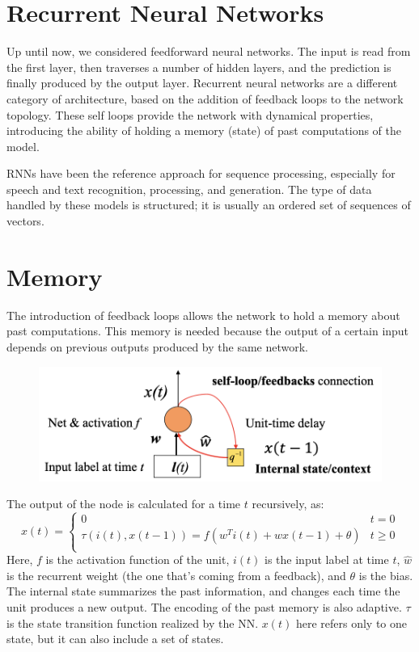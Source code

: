 \section{Recurrent Neural Networks}

Up until now, we considered feedforward neural networks. The input is read from the first layer, then traverses a number of hidden layers, and the prediction is finally produced by the output layer. Recurrent neural networks are a different category of architecture, based on the addition of feedback loops to the network topology. These self loops provide the network with dynamical properties, introducing the ability of holding a memory (state) of past computations of the model.

RNNs have been the reference approach for sequence processing, especially for speech and text recognition, processing, and generation. The type of data handled by these models is structured; it is usually an ordered set of sequences of vectors.

\section{Memory}

The introduction of feedback loops allows the network to hold a memory about past computations. This memory is needed because the output of a certain input depends on previous outputs produced by the same network.
\begin{figure}[h]
    \centering
    \includegraphics[width=0.5\linewidth]{img/RNN_unit.png}
\end{figure}

The output of the node is calculated for a time $t$ recursively, as:
\begin{equation*}
    x(t) = \begin{cases}
            0 & t = 0 \\
            \tau(i(t), x(t-1)) = f(w^Ti(t) + \hat{w}x(t-1) + \theta) & t \geq 0 \\
    \end{cases}
\end{equation*}
Here, $f$ is the activation function of the unit, $i(t)$ is the input label at time $t$, $\hat{w}$ is the recurrent weight (the one that's coming from a feedback), and $\theta$ is the bias. The internal state summarizes the past information, and changes each time the unit produces a new output. The encoding of the past memory is also adaptive. $\tau$ is the state transition function realized by the NN. $x(t)$ here refers only to one state, but it can also include a set of states.

